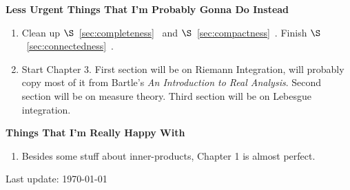 \documentclass[10pt,twoside,openany]{memoir}
\begin{document}
    \noindent \textbf{Less Urgent Things That I'm Probably Gonna Do Instead}
    \begin{enumerate}[label = (\arabic*),itemsep=1pt,topsep=3pt]
        \item Clean up $\S$~\ref{sec:completeness}~ and $\S$~\ref{sec:compactness}~. Finish $\S$~\ref{sec:connectedness}~.
        \item Start Chapter 3. First section will be on Riemann Integration, will probably copy most of it from Bartle's \textit{An Introduction to Real Analysis}. Second section will be on measure theory. Third section will be on Lebesgue integration.
    \end{enumerate}

    \noindent \textbf{Things That I'm Really Happy With}
    \begin{enumerate}[label = (\arabic*),itemsep=1pt,topsep=3pt]
        \item Besides some stuff about inner-products, Chapter 1 is almost perfect.
    \end{enumerate}


    \vfill
    \specialdate
    Last update: \today

    
    
    
\end{document}
